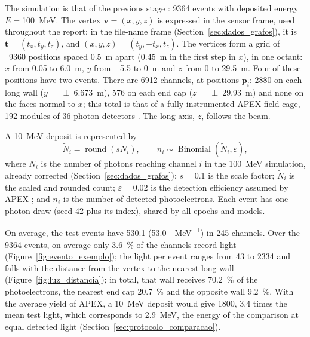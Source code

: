 The simulation is that of the previous stage \citep{vicentin2024study}: \num{9364} events with deposited energy $E = {}$\qty{100}{\MeV}. The vertex $\mathbf{v} = (x, y, z)$ is expressed in the sensor frame, used throughout the report; in the file-name frame (Section~\ref{sec:dados_grafos}), it is $\mathbf{t} = (t_x, t_y, t_z)$, and \mbox{$(x, y, z) = (t_y, -t_x, t_z)$}. The vertices form a grid of ~$=$~\num{9360} positions spaced \qty{0.5}{\m} apart (\qty{0.45}{\m} in the first step in $x$), in one octant: $x$ from \num{0.05} to \qty{6.0}{\m}, $y$ from \num{-5.5} to \qty{0}{\m} and $z$ from \num{0} to \qty{29.5}{\m}. Four of these positions have two events. There are \num{6912} channels, at positions $\mathbf{p}_i$: \num{2880} on each long wall ($y = {}$\qty{\pm 6.673}{\m}), \num{576} on each end cap ($z = {}$\qty{\pm 29.93}{\m}) and none on the faces normal to $x$; this total is that of a fully instrumented APEX field cage, \num{192} modules of \num{36} photon detectors \citep{abud2024dunephase}. The long axis, $z$, follows the beam.

A \qty{10}{\MeV} deposit is represented by
\begin{equation}
  \tilde{N}_i = \operatorname{round}(s N_i), \qquad n_i \sim \operatorname{Binomial}(\tilde{N}_i, \varepsilon),
  \label{eq:luz}
\end{equation}
where $N_i$ is the number of photons reaching channel $i$ in the \qty{100}{\MeV} simulation, already corrected (Section~\ref{sec:dados_grafos}); $s = {}$\num{0.1} is the scale factor; $\tilde{N}_i$ is the scaled and rounded count; $\varepsilon = {}$\num{0.02} is the detection efficiency assumed by APEX \citep{marinho2025apex}; and $n_i$ is the number of detected photoelectrons. Each event has one photon draw (seed \num{42} plus its index), shared by all epochs and models.

On average, the test events have \qty{530.1}{\pe} (\qty{53.0}{\pe\per\MeV}) in \num{245} channels. Over the \num{9364} events, on average only \qty{3.6}{\percent} of the channels record light (Figure~\ref{fig:evento_exemplo}); the light per event ranges from \num{43} to \qty{2334}{\pe} and falls with the distance from the vertex to the nearest long wall (Figure~\ref{fig:luz_distancia}); in total, that wall receives \qty{70.2}{\percent} of the photoelectrons, the nearest end cap \qty{20.7}{\percent} and the opposite wall \qty{9.2}{\percent}. With the average yield of APEX, a \qty{10}{\MeV} deposit would give \qty{1800}{\pe}, \num{3.4} times the mean test light, which corresponds to \qty{2.9}{\MeV}, the energy of the comparison at equal detected light (Section~\ref{sec:protocolo_comparacao}).

